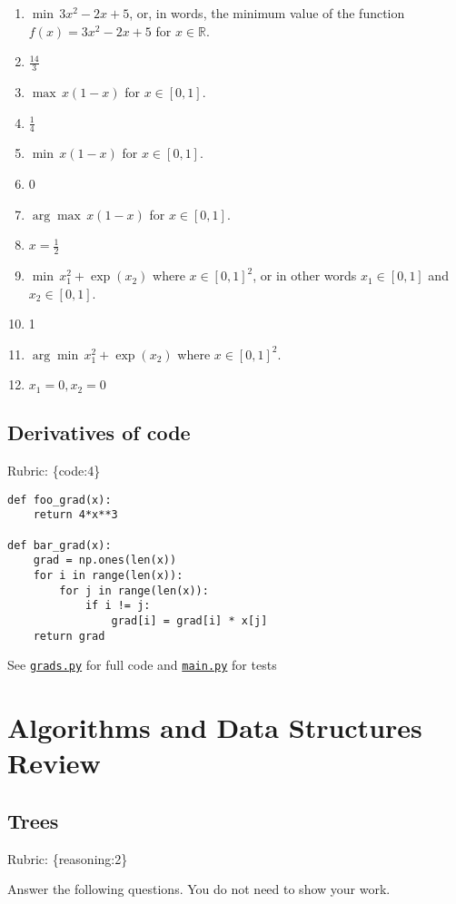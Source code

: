 \documentclass{article}
\def\rubric#1{\gre{Rubric: \{#1\}}}{}
\def\blu#1{{\color{blu}#1}}
\def\gre#1{{\color{gre}#1}}
\def\R{\mathbb{R}}
\begin{document}
\begin{enumerate}
\item $\min \, 3x^2-2x+5$, or, in words, the minimum value of the function $f(x) = 3x^2 -2x + 5$ for $x \in \R$.
\item[] \gre{$\frac{14}{3}$}
\item $\max \, x(1-x)$ for $x\in [0,1]$.
\item[] \gre{$\frac{1}{4}$}
\item $\min \, x(1-x)$ for $x\in [0,1]$.
\item[] \gre{0}
\item $\arg \max \, x(1-x)$ for $x\in[0,1]$.
\item[] \gre{$x = \frac{1}{2}$}
\item $\min \, x_1^2 + \exp(x_2)$ where $x \in [0,1]^2$, or in other words $x_1\in [0,1]$ and $x_2\in [0,1]$.
\item[] \gre{1}
\item $\arg \min \, x_1^2 + \exp(x_2)$ where $x \in [0,1]^2$.
\item[] \gre{$x_1 = 0, x_2 = 0$}
\end{enumerate}

\subsection{Derivatives of code}

\rubric{code:4}
 
\begin{lstlisting}
def foo_grad(x):
    return 4*x**3

def bar_grad(x):
    grad = np.ones(len(x))
    for i in range(len(x)):
        for j in range(len(x)):
            if i != j:
                grad[i] = grad[i] * x[j]
    return grad
\end{lstlisting}

\gre{See \hyperlink{3.4}{\texttt{grads.py}} for full code and \hyperlink{main.py}{\texttt{main.py}} for tests}

\section{Algorithms and Data Structures Review}

\subsection{Trees}
\rubric{reasoning:2}

\blu{Answer the following questions.} You do not need to show your work.
\end{document}

